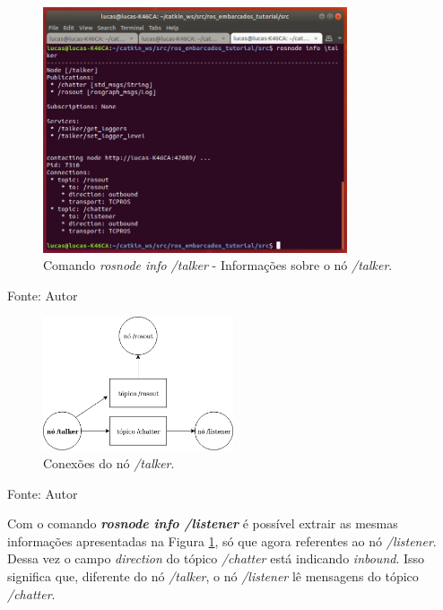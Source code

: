 \begin{figure}[!htb]
  \centering
  \caption{Comando \textit{rosnode info /talker} - Informações sobre o nó \textit{/talker}.}
  \label{fig:rosnode_info_talker}
  \includegraphics[width=0.8\textwidth]{./img/fundamentacao/rosnode_info_talker.png}
\end{figure}
Fonte: Autor

\begin{figure}[!htb]
  \centering
  \caption{Conexões do nó \textit{/talker}.}
  \label{fig:talker_rosnode_info_connect}
  \includegraphics[width=0.50\textwidth]{./img/fundamentacao/talker_rosnode_info_connect.png}
\end{figure}
Fonte: Autor

\pagebreak

Com o comando \textbf{\textit{rosnode info /listener}} é possível extrair as mesmas informações apresentadas na Figura \ref{fig:rosnode_info_talker}, só que agora referentes ao nó \textit{/listener}. 
Dessa vez o campo \textit{direction} do tópico \textit{/chatter} está indicando \textit{inbound}. Isso significa que, diferente do nó \textit{/talker}, o nó \textit{/listener} lê mensagens do tópico \textit{/chatter}.

